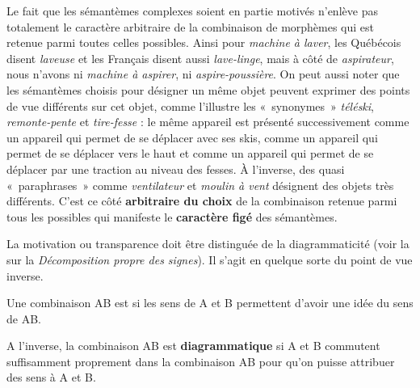 Le fait que les sémantèmes complexes soient en partie motivés n’enlève pas totalement le caractère arbitraire de la combinaison de morphèmes qui est retenue parmi toutes celles possibles. Ainsi pour \textit{machine à laver}, les Québécois disent \textit{laveuse} et les Français disent aussi \textit{lave-linge}, mais à côté de \textit{aspirateur}, nous n’avons ni \textit{machine à aspirer}, ni \textit{aspire-poussière}. On peut aussi noter que les sémantèmes choisis pour désigner un même objet peuvent exprimer des points de vue différents sur cet objet, comme l’illustre les «~synonymes~» \textit{téléski}, \textit{remonte-pente} et \textit{tire-fesse} : le même appareil est présenté successivement comme un appareil qui permet de se déplacer avec ses skis, comme un appareil qui permet de se déplacer vers le haut et comme un appareil qui permet de se déplacer par une traction au niveau des fesses. À l’inverse, des quasi «~paraphrases~» comme \textit{ventilateur} et \textit{moulin à vent} désignent des objets très différents. C’est ce côté \textbf{arbitraire du choix} de la combinaison retenue parmi tous les possibles qui manifeste le \textbf{caractère figé} des sémantèmes.

La motivation ou transparence doit être distinguée de la diagrammaticité (voir la  sur la \textit{Décomposition propre des signes}). Il s’agit en quelque sorte du point de vue inverse.

{Une combinaison AB est  si les sens de A et B permettent d’avoir une idée du sens de AB.}

A l’inverse, la combinaison AB est \textbf{diagrammatique} si A et B commutent suffisamment proprement dans la combinaison AB pour qu’on puisse attribuer des sens à A et B.

